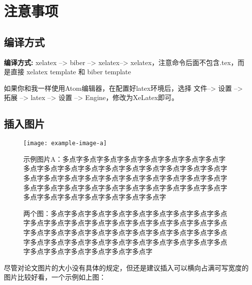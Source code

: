 \documentclass[AutoFakeBold]{LZUThesis-PgD&PhD}
\begin{document}
\mainmatter

\chapter{注意事项}

\section{编译方式}

 {\bfseries 编译方式:} xelatex --> biber --> xelatex--> xelatex，注意命令后面不包含.tex，而是直接 xelatex template 和 biber template

如果你和我一样使用Atom编辑器，在配置好latex环境后，选择 文件--> 设置 --> 拓展 --> latex --> 设置 --> Engine，修改为XeLatex即可。

\section{插入图片}

\begin{figure}[hbt!]
    \texttt{[image: example-image-a]}
    \centering
    \caption{示例图片A：多点字多点字多点字多点字多点字多点字多点字多点字多点字多点字多点字多点字多点字多点字多点字多点字多点字多点字多点字多点字多点字多点字多点字多点字多点字多点字多点字多点字多点字多点字多点字多点字多点字多点字多点字多点字多点字多点字多点字多点字多点字多点字多点字多点字多点字}
    \label{fig:obj_dect}
\end{figure}


\begin{figure}[H]
    \centering
    \caption{两个图：多点字多点字多点字多点字多点字多点字多点字多点字多点字多点字多点字多点字多点字多点字多点字多点字多点字多点字多点字多点字多点字多点字多点字多点字多点字多点字多点字多点字多点字多点字多点字多点字多点字多点字多点字多点字多点字多点字多点字多点字多点字多点字多点字多点字多点字}
    \label{fig_ldr}
\end{figure}

尽管对论文图片的大小没有具体的规定，但还是建议插入可以横向占满可写宽度的图片比较好看，一个示例如上图：

\end{document}
